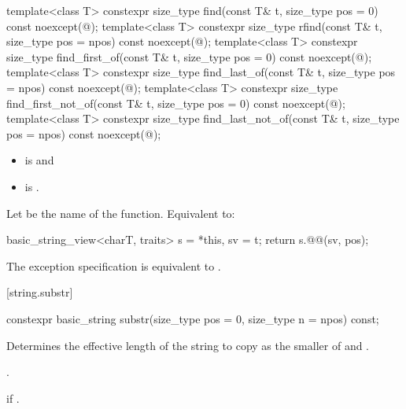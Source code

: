 %
%
%
%
%
%
\begin{itemdecl}
template<class T>
  constexpr size_type find(const T& t, size_type pos = 0) const noexcept(@\seebelow@);
template<class T>
  constexpr size_type rfind(const T& t, size_type pos = npos) const noexcept(@\seebelow@);
template<class T>
  constexpr size_type find_first_of(const T& t, size_type pos = 0) const noexcept(@\seebelow@);
template<class T>
  constexpr size_type find_last_of(const T& t, size_type pos = npos) const noexcept(@\seebelow@);
template<class T>
  constexpr size_type find_first_not_of(const T& t, size_type pos = 0) const noexcept(@\seebelow@);
template<class T>
  constexpr size_type find_last_not_of(const T& t, size_type pos = npos) const noexcept(@\seebelow@);
\end{itemdecl}

\begin{itemdescr}
\pnum
\constraints
\begin{itemize}
\item
{} is
 and
\item
{} is
.
\end{itemize}

\pnum
\effects
Let  be the name of the function.
Equivalent to:
\begin{codeblock}
basic_string_view<charT, traits> s = *this, sv = t;
return s.@@(sv, pos);
\end{codeblock}

\pnum
\remarks
The exception specification is equivalent to
.
\end{itemdescr}

[string.substr]{}

%
\begin{itemdecl}
constexpr basic_string substr(size_type pos = 0, size_type n = npos) const;
\end{itemdecl}

\begin{itemdescr}
\pnum
\effects
Determines the effective length  of the string to copy as the smaller of  and
.

\pnum
\returns
{}.

\pnum
\throws
{}
if
.
\end{itemdescr}

